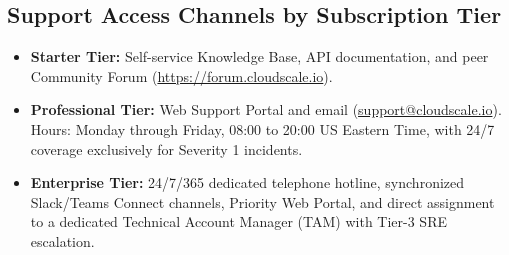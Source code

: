 \documentclass[10pt,letterpaper]{article}
\begin{document}
\subsection{Support Access Channels by Subscription Tier}
\begin{itemize}[leftmargin=1.5em, itemsep=0.5pt, topsep=1pt]
  \item \textbf{Starter Tier:} Self-service Knowledge Base, API documentation, and peer Community Forum (\url{https://forum.cloudscale.io}).
  \item \textbf{Professional Tier:} Web Support Portal and email (\url{support@cloudscale.io}). Hours: Monday through Friday, 08:00 to 20:00 US Eastern Time, with 24/7 coverage exclusively for Severity 1 incidents.
  \item \textbf{Enterprise Tier:} 24/7/365 dedicated telephone hotline, synchronized Slack/Teams Connect channels, Priority Web Portal, and direct assignment to a dedicated Technical Account Manager (TAM) with Tier-3 SRE escalation.
\end{itemize}

\newpage

\end{document}
